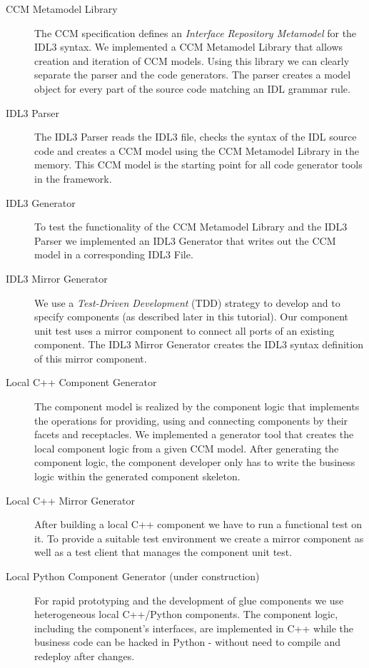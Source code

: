 \begin{description}
\item [CCM Metamodel Library]
The CCM specification defines an {\it Interface Repository Metamodel} for the IDL3 syntax. 
We implemented a CCM Metamodel Library that allows creation and iteration of CCM models. 
Using this library we can clearly separate the parser and the code generators. The parser
creates a model object for every part of the source code matching an IDL grammar
rule.

\item [IDL3 Parser]
The IDL3 Parser reads the IDL3 file, checks the syntax of the IDL source code
and creates a CCM model using the CCM Metamodel Library in the memory. This CCM
model is the starting point for all code generator tools in the framework.


\item [IDL3 Generator]
To test the functionality of the CCM Metamodel Library and the IDL3 Parser we implemented
an IDL3 Generator that writes out the CCM model in a corresponding IDL3 File.


\item [IDL3 Mirror Generator]
We use a {\it Test-Driven Development} (TDD) strategy to develop and to specify components
(as described later in this tutorial). Our component unit test uses a mirror component
to connect all ports of an existing component.
The IDL3 Mirror Generator creates the IDL3 syntax definition of this mirror component.


\item [Local C++ Component Generator]
The component model is realized by the component logic that implements the
operations for providing, using and connecting components by their facets and receptacles. 
We implemented a generator tool that creates the local component logic from a given
CCM model. After generating the component logic, the component developer only
has to write the business logic within the generated component skeleton.


\item [Local C++ Mirror Generator]
After building a local C++ component we have to run a functional test on it. 
To provide a suitable test environment we create a mirror component
as well as a test client that manages the component unit test.

\item [Local Python Component Generator (under construction)] 
For rapid prototyping and the development of glue components we use 
heterogeneous local C++/Python components. The component logic, including the
component's interfaces, are implemented in C++ while the business code
can be hacked in Python - without need to compile and redeploy after changes.



\end{description}
